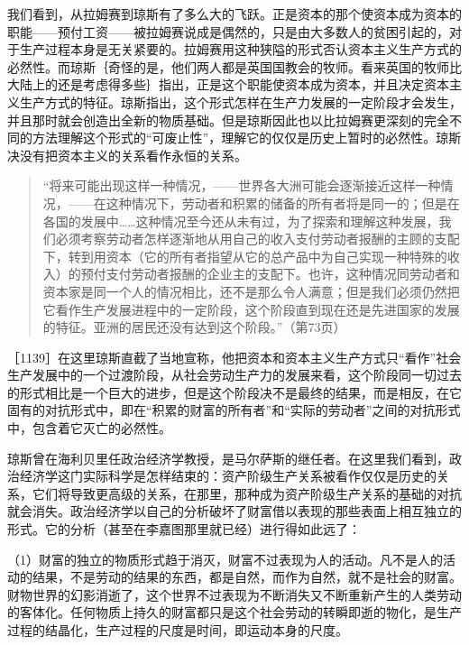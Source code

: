 我们看到，从拉姆赛到琼斯有了多么大的飞跃。正是资本的那个使资本成为资本的职能——预付工资——被拉姆赛说成是偶然的，只是由大多数人的贫困引起的，对于生产过程本身是无关紧要的。拉姆赛用这种狭隘的形式否认资本主义生产方式的必然性。而琼斯｛奇怪的是，他们两人都是英国国教会的牧师。看来英国的牧师比大陆上的还是考虑得多些｝指出，正是这个职能使资本成为资本，并且决定资本主义生产方式的特征。琼斯指出，这个形式怎样在生产力发展的一定阶段才会发生，并且那时就会创造出全新的物质基础。但是琼斯因此也以比拉姆赛更深刻的完全不同的方法理解这个形式的“可废止性”，理解它的仅仅是历史上暂时的必然性。琼斯决没有把资本主义的关系看作永恒的关系。

\begin{quote}{“将来可能出现这样一种情况，——世界各大洲可能会逐渐接近这样一种情况，——在这种情况下，劳动者和积累的储备的所有者将是同一的；但是在各国的发展中……这种情况至今还从未有过，为了探索和理解这种发展，我们必须考察劳动者怎样逐渐地从用自己的收入支付劳动者报酬的主顾的支配下，转到用资本（它的所有者指望从它的总产品中为自己实现一种特殊的收入）的预付支付劳动者报酬的企业主的支配下。也许，这种情况同劳动者和资本家是同一个人的情况相比，还不是那么令人满意；但是我们必须仍然把它看作生产发展进程中的一定阶段，这个阶段直到现在还是先进国家的发展的特征。亚洲的居民还没有达到这个阶段。”（第73页）}\end{quote}

［1139］在这里琼斯直截了当地宣称，他把资本和资本主义生产方式只“看作”社会生产发展中的一个过渡阶段，从社会劳动生产力的发展来看，这个阶段同一切过去的形式相比是一个巨大的进步，但是这个阶段决不是最终的结果，而是相反，在它固有的对抗形式中，即在“积累的财富的所有者”和“实际的劳动者”之间的对抗形式中，包含着它灭亡的必然性。

琼斯曾在海利贝里任政治经济学教授，是马尔萨斯的继任者。在这里我们看到，政治经济学这门实际科学是怎样结束的：资产阶级生产关系被看作仅仅是历史的关系，它们将导致更高级的关系，在那里，那种成为资产阶级生产关系的基础的对抗就会消失。政治经济学以自己的分析破坏了财富借以表现的那些表面上相互独立的形式。它的分析（甚至在李嘉图那里就已经）进行得如此远了：

（1）财富的独立的物质形式趋于消灭，财富不过表现为人的活动。凡不是人的活动的结果，不是劳动的结果的东西，都是自然，而作为自然，就不是社会的财富。财物世界的幻影消逝了，这个世界不过表现为不断消失又不断重新产生的人类劳动的客体化。任何物质上持久的财富都只是这个社会劳动的转瞬即逝的物化，是生产过程的结晶化，生产过程的尺度是时间，即运动本身的尺度。

